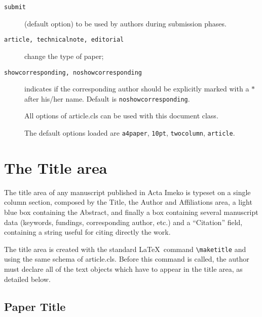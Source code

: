\documentclass[10pt]{imeko_acta}
\def\file#1{\textsf{\fontsize{9.1}{9.5}\selectfont#1}\xspace}
\begin{document}
\begin{description}

\item [{\tt submit}]  (default option) to be used by authors during submission phases.


\item [{\tt article, technicalnote, editorial}]  change the type of paper;

\item [{\tt showcorresponding, noshowcorresponding}] indicates if the corresponding author should be explicitly marked with a $\ast$ after his/her name. Default is \verb|noshowcorresponding|.



\item[] All options of \file{article.cls} can be used with this
  document class.

\item[] The default options loaded are \verb+a4paper+, \verb+10pt+,
  \verb+twocolumn+, \verb+article+.

\end{description}

\section{The Title area}

The title area of any manuscript published in Acta Imeko is typeset on a single column section, composed by the Title, the Author and Affiliations area, a light blue box containing the Abstract, and finally a box containing several manuscript data (keywords, fundings, corresponding author, etc.) and a ``Citation'' field, containing a string useful for citing directly the work.

The title area is created with the standard \LaTeX\ command \verb|\maketitle| and using the same schema of article.cls.
Before this command is called, the author must declare all of the text objects which have to appear in the title area, as detailed below.

\subsection{Paper Title} \label{sec:sub1}
\end{document}
